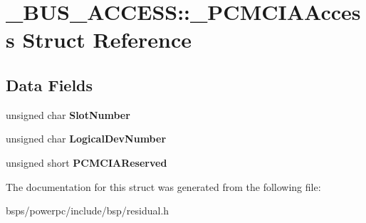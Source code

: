 \hypertarget{struct__BUS__ACCESS_1_1__PCMCIAAccess}{}\section{\+\_\+\+B\+U\+S\+\_\+\+A\+C\+C\+E\+SS\+::\+\_\+\+P\+C\+M\+C\+I\+A\+Access Struct Reference}
\label{struct__BUS__ACCESS_1_1__PCMCIAAccess}
\subsection*{Data Fields}
\begin{DoxyCompactItemize}
\item 
\mbox{\label{struct__BUS__ACCESS_1_1__PCMCIAAccess_a5cefcd96cde23e7196590eb7c915462b}} 
unsigned char {\bfseries Slot\+Number}
\item 
\mbox{\label{struct__BUS__ACCESS_1_1__PCMCIAAccess_a60789dc66f930c674a27395fc990528a}} 
unsigned char {\bfseries Logical\+Dev\+Number}
\item 
\mbox{\label{struct__BUS__ACCESS_1_1__PCMCIAAccess_ab69c74919200a64f59bd0bbcb1dcd44a}} 
unsigned short {\bfseries P\+C\+M\+C\+I\+A\+Reserved}
\end{DoxyCompactItemize}


The documentation for this struct was generated from the following file\+:\begin{DoxyCompactItemize}
\item 
bsps/powerpc/include/bsp/residual.\+h\end{DoxyCompactItemize}
